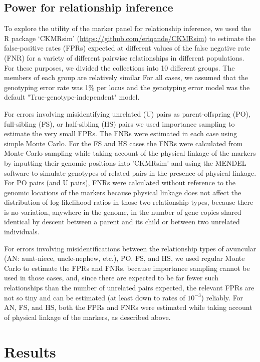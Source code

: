 \subsection*{Power for relationship inference}

To explore the utility of the marker panel for relationship inference, we used
the R package `CKMRsim'
(\url{https://github.com/eriqande/CKMRsim})
to estimate the false-positive rates (FPRs) expected at
different values of the false negative rate (FNR) for a variety of different pairwise
relationships in different populations.  For these purposes, we divided the
collections into 10 different groups.  The members of each group are
relatively similar For all cases, we assumed that the genotyping error rate
was 1\% per locus and the genotyping error model was the default
"True-genotype-independent" model. 

For errors involving misidentifying
unrelated (U) pairs as parent-offspring (PO), full-sibling (FS), or half-sibling (HS)
pairs we used importance sampling to estimate the very small FPRs.  The
FNRs were estimated in each case using simple Monte Carlo.  For the FS and
HS cases the FNRs were calculated from Monte Carlo sampling while taking account
of the physical linkage of the markers by inputting their genomic positions into
'CKMRsim' and using the MENDEL \citep{lange2013mendel} software to simulate genotypes of related pairs
in the presence of physical linkage.  For PO pairs (and U pairs),
FNRs were calculated without reference to the genomic locations of the markers
because physical linkage does not
affect the distribution of log-likelihood ratios in those two relationship types,
because there is no variation, anywhere
in the genome, in the number of gene copies shared identical by descent between
a parent and its child or between two unrelated individuals.

For errors involving misidentifications between the relationship
types of avuncular (AN: aunt-niece, uncle-nephew, etc.), PO, FS, and HS,
we used regular Monte Carlo to estimate the FPRs and FNRs, because
importance sampling cannot be used in those cases, and, since there are
expected to be far fewer such relationships than the number of unrelated
pairs expected, the relevant FPRs are not so tiny and can be estimated
(at least down to rates of $10^{-3}$) reliably.  For AN, FS, and HS, both the
FPRs and FNRs were estimated while taking account of physical linkage
of the markers, as described above.

\section*{Results}

